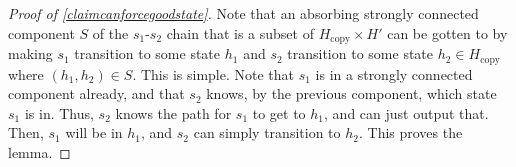 \documentclass[12pt]{article}
\theoremstyle{definition}
\newtheorem{claim}[theorem]{Claim}
\theoremstyle{remark}
\begin{document}
      \begin{proof}[Proof of \cref{claimcanforcegoodstate}]
        Note that an absorbing strongly connected component $S$ of the $s_1$-$s_2$ chain that is a subset of $H_\text{copy} \times H'$ can be gotten to by making $s_1$ transition to some state $h_1$ and $s_2$ transition to some state $h_2 \in H_\text{copy}$ where $(h_1, h_2) \in S$. This is simple. Note that $s_1$ is in a strongly connected component already, and that $s_2$ knows, by the previous component, which state $s_1$ is in. Thus, $s_2$ knows the path for $s_1$ to get to $h_1$, and can just output that. Then, $s_1$ will be in $h_1$, and $s_2$ can simply transition to $h_2$. This proves the lemma.
      \end{proof}



      
\end{document}

